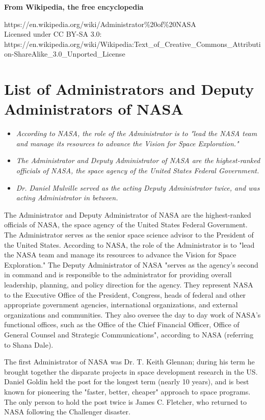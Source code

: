 \textbf{From Wikipedia, the free encyclopedia}

https://en.wikipedia.org/wiki/Administrator\%20of\%20NASA\\
Licensed under CC BY-SA 3.0:\\
https://en.wikipedia.org/wiki/Wikipedia:Text\_of\_Creative\_Commons\_Attribution-ShareAlike\_3.0\_Unported\_License

\section{List of Administrators and Deputy Administrators of
NASA}\label{list-of-administrators-and-deputy-administrators-of-nasa}

\begin{itemize}
\item
  \emph{According to NASA, the role of the Administrator is to "lead the
  NASA team and manage its resources to advance the Vision for Space
  Exploration."}
\item
  \emph{The Administrator and Deputy Administrator of NASA are the
  highest-ranked officials of NASA, the space agency of the United
  States Federal Government.}
\item
  \emph{Dr. Daniel Mulville served as the acting Deputy Administrator
  twice, and was acting Administrator in between.}
\end{itemize}

The Administrator and Deputy Administrator of NASA are the
highest-ranked officials of NASA, the space agency of the United States
Federal Government. The Administrator serves as the senior space science
advisor to the President of the United States. According to NASA, the
role of the Administrator is to "lead the NASA team and manage its
resources to advance the Vision for Space Exploration." The Deputy
Administrator of NASA "serves as the agency's second in command and is
responsible to the administrator for providing overall leadership,
planning, and policy direction for the agency. They represent NASA to
the Executive Office of the President, Congress, heads of federal and
other appropriate government agencies, international organizations, and
external organizations and communities. They also oversee the day to day
work of NASA's functional offices, such as the Office of the Chief
Financial Officer, Office of General Counsel and Strategic
Communications", according to NASA (referring to Shana Dale).

The first Administrator of NASA was Dr. T. Keith Glennan; during his
term he brought together the disparate projects in space development
research in the US. Daniel Goldin held the post for the longest term
(nearly 10 years), and is best known for pioneering the "faster, better,
cheaper" approach to space programs. The only person to hold the post
twice is James C. Fletcher, who returned to NASA following the
Challenger disaster.

